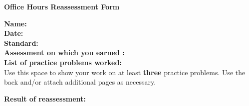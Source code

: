 \documentclass[letterpaper]{article}
\begin{document}
\begin{center}
{\Large \bf Office Hours Reassessment Form} \\
\large \course
\end{center}



\vspace{0.2in}

\begin{flushleft}
{\bf Name: } \underline{\phantom{xxxxxxxxxxxxxxxxxxxxxxxxxxxxxxxxxxxxxxxxxxxxxxxxxxxxxxxxx}} \\
\vspace{0.15in}
{\bf Date: } \underline{\phantom{xxxxxxxxxxxxxxxxxxxxxxxxxxxxxxxxxxxxxxxxxxxxxxxxxxxxxxxxx}} \\
\vspace{0.15in}
{\bf Standard: } \underline{\phantom{xxxxxxxxxxxxxxxxxxx}} \\
\vspace{0.15in}
{\bf Assessment on which you earned : } \underline{\phantom{xxxxxxxxxxxxxxxxxxxxxxxxxxxxx}} \\
\vspace{0.15in}
{\bf List of practice problems worked: } \\
\vspace{0.4in}
Use this space to show your work on at least {\bf three} practice problems.  Use the back and/or attach additional pages as necessary.

\vfill

\vspace{0.15in}
{\bf Result of reassessment: } \underline{\phantom{xxxxxxxxxxxxxxxxxxxxxxx}} \\

\end{flushleft}
\end{document}
